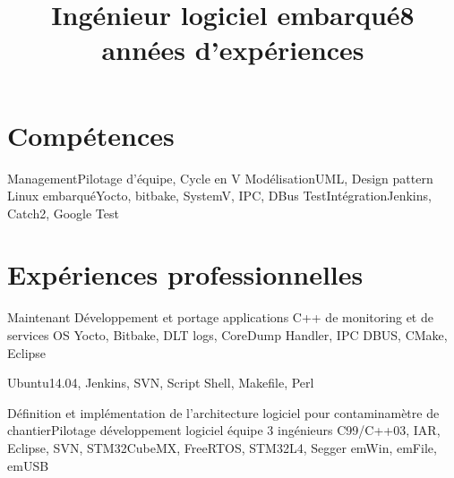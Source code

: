 \documentclass[10pt, a4paper, sans]{moderncv}
\title{Ingénieur logiciel embarqué\newline \large 8 années d'expériences}
\begin{document}
\makecvtitle

\section{Compétences}

	{Management}{Pilotage d'équipe, Cycle en V}
	{Modélisation}{UML, Design pattern}
	{Linux embarqué}{Yocto, bitbake, SystemV, IPC, DBus}
	{Test\newline Intégration}{Jenkins, Catch2, Google Test}

\section{Expériences professionnelles}

	{Maintenant Développement et portage applications C++ de monitoring et de services OS}
	{Yocto, Bitbake, DLT logs, CoreDump Handler, IPC DBUS, CMake, Eclipse}
	
	{Ubuntu14.04, Jenkins, SVN, Script Shell, Makefile, Perl}{}

	{Définition et implémentation de l’architecture logiciel pour contaminamètre de chantier}{Pilotage développement logiciel équipe 3 ingénieurs}
	{C99/C++03, IAR, Eclipse, SVN, STM32CubeMX, FreeRTOS, STM32L4, Segger emWin, emFile, emUSB}
\end{document}
